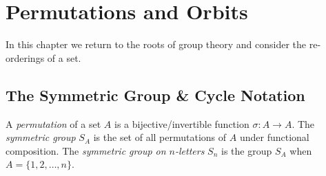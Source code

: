 \graphicspath{{5perm/asy/}}

\section{Permutations and Orbits}\label{chap:perm}

In this chapter we return to the roots of group theory and consider the re-orderings of a set.

\subsection{The Symmetric Group \& Cycle Notation}\label{sec:perm1}

\begin{defn}{}{}
A \emph{permutation} of a set $A$ is a bijective/invertible function $\sigma:A\to A$.\smallbreak
The \emph{symmetric group} $S_A$ is the set of all permutations of $A$ under functional composition.\smallbreak
The \emph{symmetric group on $n$-letters\footnotemark} $S_n$ is the group $S_A$ when $A=\{1,2,\ldots,n\}$.
\end{defn}



